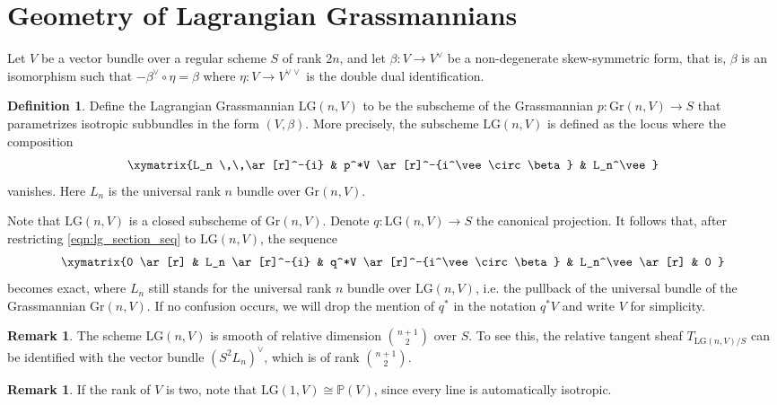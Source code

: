 \documentclass[a4paper]{amsart}
\theoremstyle{plain}
\theoremstyle{definition}
\newtheorem{definition}[theorem]{Definition}
\newtheorem{remark}[theorem]{Remark}
\numberwithin{equation}{section}
\newcommand{\Gr}{\mathrm{Gr}}
\newcommand{\LG}{\mathrm{LG}}
\begin{document}
\section{Geometry of Lagrangian Grassmannians}\label{sec:LagrangianGrass}


Let $V$ be a vector bundle over a regular scheme $S$ of rank $2n$, and let $ \beta: V \to V^{\vee}$ be a non-degenerate skew-symmetric form, that is, $\beta$ is an isomorphism such that $-\beta^\vee\circ \eta = \beta $ where $\eta: V \to V^{\vee \vee}$ is the double dual identification.

\begin{definition}
    Define the Lagrangian Grassmannian $\LG(n,V)$ to be the subscheme of the Grassmannian $p:\Gr(n,V)\to S$ that parametrizes isotropic subbundles in the form $(V,\beta)$. More precisely, the subscheme $\LG(n,V)$ is defined as the locus where the composition
    \begin{equation}\label{eqn:lg_section_seq}
        \xymatrix{L_n \,\,\ar[r]^-{i} & p^*V \ar[r]^-{i^\vee \circ \beta} & L_n^\vee  }
    \end{equation}
    vanishes. Here $L_n$ is the universal rank $n$ bundle over $\Gr(n,V)$.
\end{definition}
Note that $\LG(n,V)$ is a closed subscheme of $\Gr(n,V)$.
Denote $q:\LG(n,V) \to S $ the canonical projection. It follows that, after restricting \eqref{eqn:lg_section_seq} to $\LG(n,V)$, the sequence
\begin{equation}\label{eqn:lg_tautological_bundle_exact}
    \xymatrix{0 \ar[r] & L_n \ar[r]^-{i} & q^*V \ar[r]^-{i^\vee \circ \beta} & L_n^\vee \ar[r] & 0  }
\end{equation}
becomes exact, where $L_n$ still stands for the universal rank $n$ bundle over $\LG(n,V)$, i.e. the pullback of the universal bundle of the Grassmannian $\Gr(n,V)$. If no confusion occurs, we will drop the mention of $q^*$ in the notation $q^*V $ and write $V$ for simplicity.
\begin{remark}
    The scheme $\LG(n,V)$ is smooth of relative dimension $\binom{n+1}{2}$ over $S$. To see this, the relative tangent sheaf $T_{\LG(n,V)/S}$ can be identified with the vector bundle $(S^2L_n)^\vee$, which is of rank $\binom{n+1}{2}$.
\end{remark}
\begin{remark}
    If the rank of $V$ is two, note that $\LG(1,V) \cong \mathbb{P}(V)$, since every line is automatically isotropic.
\end{remark}
\end{document}

